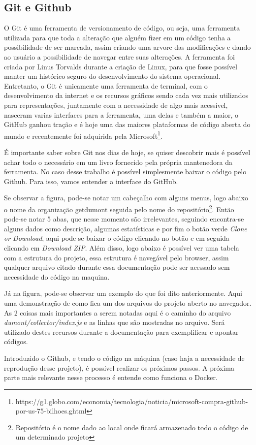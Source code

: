 \subsection{Git e Github}
O Git é uma ferramenta de versionamento de código, ou seja, uma ferramenta utilizada para que toda a alteração que alguém fizer em um código tenha a possibilidade de ser marcada, assim criando uma arvore das modificações e dando ao usuário a possibilidade de navegar entre suas alterações. A ferramenta foi criada por Linus Torvalds durante a criação de Linux, para que fosse possível manter um histórico seguro do desenvolvimento do sistema operacional. Entretanto, o Git é unicamente uma ferramenta de terminal, com o desenvolvimento da internet e os recursos gráficos sendo cada vez mais utilizados para representações, juntamente com a necessidade de algo mais acessível, nasceram varias interfaces para a ferramenta, uma delas e também a maior, o GitHub ganhou tração e é hoje uma das maiores plataformas de código aberta do mundo e recentemente foi adquirida pela Microsoft\footnote{https://g1.globo.com/economia/tecnologia/noticia/microsoft-compra-github-por-us-75-bilhoes.ghtml}.

É importante saber sobre Git nos dias de hoje, se quiser descobrir mais é possível achar todo o necessário em um livro fornecido pela própria mantenedora da ferramenta. No caso desse trabalho é possível simplesmente baixar o código pelo Github. Para isso, vamos entender a interface do GitHub.

Se observar a figura, pode-se notar um cabeçalho com alguns menus, logo abaixo o nome da organização getdumont seguida pelo nome do repositório\footnote{Repositório é o nome dado ao local onde ficará armazenado todo o código de um determinado projeto}. Então pode-se notar 5 abas, que nesse momento são irrelevantes, seguindo encontra-se alguns dados como descrição, algumas estatísticas e por fim o botão verde \textit{Clone or Download}, aqui pode-se baixar o código clicando no botão e em seguida clicando em \textit{Download ZIP}. Além disso, logo abaixo é possível ver uma tabela com a estrutura do projeto, essa estrutura é navegável pelo browser, assim qualquer arquivo citado durante essa documentação pode ser acessado sem necessidade do código na maquina.

Já na figura, pode-se observar um exemplo do que foi dito anteriormente. Aqui uma demonstração de como fica um dos arquivos do projeto aberto no navegador. As 2 coisas mais importantes a serem notadas aqui é o caminho do arquivo \textit{dumont/collector/index.js} e as linhas que são mostradas no arquivo. Será utilizado destes recursos durante a documentação para exemplificar e apontar códigos.

Introduzido o Github, e tendo o código na máquina (caso haja a necessidade de reprodução desse projeto), é possível realizar os próximos passos. A próxima parte mais relevante nesse processo é entende como funciona o Docker.
